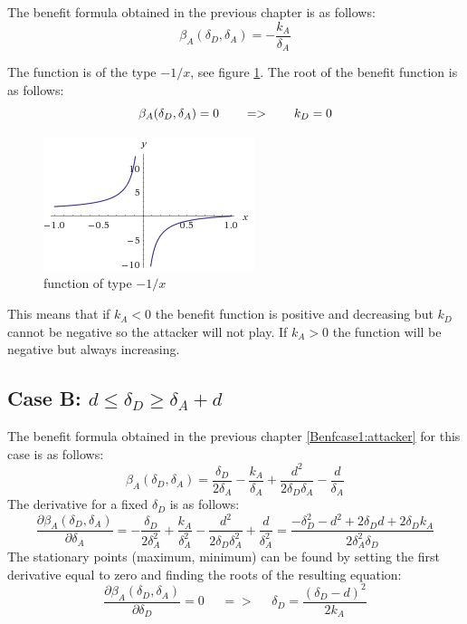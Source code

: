 The benefit formula obtained in the previous chapter is as follows:
\begin{equation}
\beta_{A}(\delta_{D},\delta_{A}) =  - \dfrac{k_{A}}{\delta_{A}}
\end{equation}


The function is of the type $-1/x$, see figure \ref{1xx}. The root of the benefit function is as follows:
\begin{equation}
\beta_{A}(\delta_{D},\delta_{A}) =0  ~~~~~~ =>~~~~~~k_{D} = 0 \\
\end{equation}


\begin{figure}[hbtp]
\centering
\includegraphics[scale=1]{Images/1x.png}
\caption{function of type $-1/x$}
\label{1xx}
\end{figure}

This means that if $k_{A} < 0$ the benefit function is positive and decreasing but $k_{D}$ cannot be negative so the attacker will not play. If $k_{A} > 0$ the function will be negative but always increasing.



\subsection*{Case B: $d \leq \delta_{D} \geq \delta_{A} + d$}

The benefit formula obtained in the previous chapter \ref{Benfcase1:attacker} for this case is as follows:
\begin{equation*}
\beta_{A}(\delta_{D},\delta_{A}) =\dfrac{\delta_{D}}{2\delta_{A}} - \dfrac{k_{A}}{\delta_{A}} + \dfrac{d^{2}}{2\delta_{D}\delta_{A}} - \dfrac{d}{\delta_{A}}
\end{equation*}
The derivative for a fixed $\delta_{D}$ is as follows:
\begin{equation*}
\dfrac{\partial \beta_{A}(\delta_{D},\delta_{A})}{\partial \delta_{A}} = -\dfrac{\delta_{D}}{2\delta_{A}^{2}} + \dfrac{k_{A}}{\delta_{A}^{2}} - \dfrac{d^{2}}{2\delta_{D}\delta_{A}^{2}} + \dfrac{d}{\delta_{A}^{2}} = \dfrac{-\delta_{D}^{2} - d^{2} + 2\delta_{D}d + 2\delta_{D}k_{A}}{2\delta_{A}^{2}\delta_{D}}
\end{equation*}
The stationary points (maximum, minimum) can be found by setting the first derivative equal to zero and finding the roots of the resulting equation:
\begin{equation*}
\frac{\partial \beta_{A}(\delta_{D},\delta_{A})}{\partial \delta_{D}} =0 ~~~~~~ =>~~~~~~  \delta_{D}= \dfrac{(\delta_{D}-d)^{2}}{2k_{A}}
\end{equation*}

